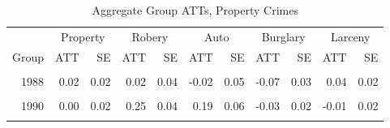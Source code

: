 \begin{table}[!h]

\caption{\label{tab:CSEst}Aggregate Group ATTs, Property Crimes}
\centering
\begin{tabular}[t]{rrrrrrrrrrr}
\toprule
\multicolumn{1}{c}{ } & \multicolumn{2}{c}{Property} & \multicolumn{2}{c}{Robery} & \multicolumn{2}{c}{Auto} & \multicolumn{2}{c}{Burglary} & \multicolumn{2}{c}{Larceny} \\
\cmidrule(l{3pt}r{3pt}){2-3} \cmidrule(l{3pt}r{3pt}){4-5} \cmidrule(l{3pt}r{3pt}){6-7} \cmidrule(l{3pt}r{3pt}){8-9} \cmidrule(l{3pt}r{3pt}){10-11}
Group & ATT & SE & ATT & SE & ATT & SE & ATT & SE & ATT & SE\\
\midrule
\cellcolor{gray!6}{1987} & \cellcolor{gray!6}{-0.10} & \cellcolor{gray!6}{0.03} & \cellcolor{gray!6}{-0.28} & \cellcolor{gray!6}{0.04} & \cellcolor{gray!6}{0.00} & \cellcolor{gray!6}{0.05} & \cellcolor{gray!6}{-0.12} & \cellcolor{gray!6}{0.03} & \cellcolor{gray!6}{-0.09} & \cellcolor{gray!6}{0.02}\\
1988 & 0.02 & 0.02 & 0.02 & 0.04 & -0.02 & 0.05 & -0.07 & 0.03 & 0.04 & 0.02\\
\cellcolor{gray!6}{1989} & \cellcolor{gray!6}{0.02} & \cellcolor{gray!6}{0.06} & \cellcolor{gray!6}{-0.14} & \cellcolor{gray!6}{0.14} & \cellcolor{gray!6}{-0.17} & \cellcolor{gray!6}{0.10} & \cellcolor{gray!6}{-0.03} & \cellcolor{gray!6}{0.09} & \cellcolor{gray!6}{0.06} & \cellcolor{gray!6}{0.06}\\
1990 & 0.00 & 0.02 & 0.25 & 0.04 & 0.19 & 0.06 & -0.03 & 0.02 & -0.01 & 0.02\\
\cellcolor{gray!6}{1991} & \cellcolor{gray!6}{0.01} & \cellcolor{gray!6}{0.02} & \cellcolor{gray!6}{0.28} & \cellcolor{gray!6}{0.04} & \cellcolor{gray!6}{0.03} & \cellcolor{gray!6}{0.06} & \cellcolor{gray!6}{-0.11} & \cellcolor{gray!6}{0.03} & \cellcolor{gray!6}{0.01} & \cellcolor{gray!6}{0.02}\\
\bottomrule
\end{tabular}
\end{table}
